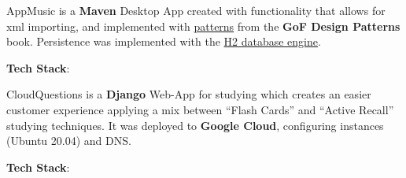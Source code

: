 \documentclass[10pt,a4paper,ragged2e]{altacv}
\begin{document}
\vspace{2mm}


\divider


AppMusic is a \textbf{Maven} Desktop App created with functionality that allows
for xml importing, and implemented with
\href{https://github.com/Qkessler/AppMusic#patterns}{patterns} from
the \textbf{GoF Design Patterns} book. Persistence was implemented with the
\href{https://www.h2database.com/html/main.html}{H2 database engine}.

\vspace{2mm}

\textbf{Tech Stack}:
\\

\vspace{2mm}


\divider

CloudQuestions is a \textbf{Django} Web-App for studying which creates an easier customer experience applying a mix between “Flash Cards” and “Active Recall” studying techniques. It was deployed to \textbf{Google Cloud}, configuring instances (Ubuntu 20.04) and DNS.

\vspace{2mm}

\textbf{Tech Stack}:
\\

\vspace{2mm}


\medskip

\clearpage

\end{document}
